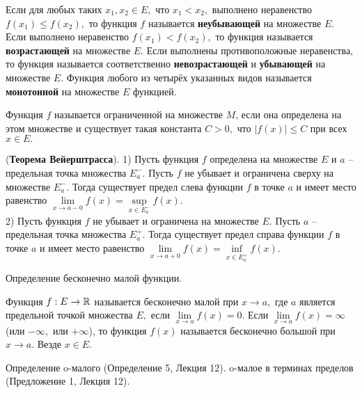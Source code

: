 \begin{definition}
	Если для любых таких $x_1, x_2 \in E,$
	что $x_1<x_2,$ выполнено неравенство
	$f(x_1)\leq f(x_2),$ то функция $f$
	называется \textbf{неубывающей} на множестве
	$E.$ Если выполнено неравенство
	$f(x_1)<f(x_2),$ то функция называется
	\textbf{возрастающей} на множестве $E.$ Если выполнены
	противоположные неравенства, то функция
	называется соответственно \textbf{невозрастающей}
	и \textbf{убывающей} на множестве $E.$
	Функция любого из четырёх
	указанных видов называется \textbf{монотонной}
	на множестве $E$ функцией.
\end{definition}

\begin{definition}
	Функция $f$
	называется ограниченной на множестве $M$,
	если она определена на этом множестве и
	существует такая константа $C>0,$
	что $|f(x)|\leq C$ при всех $x \in E.$
\end{definition}

\begin{theorem} (\textbf{Теорема Вейерштрасса}).
	1) Пусть функция $f$ определена на множестве $E$
	и $a$ -- предельная точка
	множества $E^-_a.$
	Пусть $f$ не убывает и ограничена сверху
	на множестве $E^-_a.$ Тогда существует предел слева
	функции $f$ в точке $a$ и имеет место равенство
	$
		\lim\limits_{x\rightarrow a-0}f(x)=
		\sup\limits_{x \in E^-_a}f(x).
	$\\
	2) Пусть функция $f$ не убывает и ограничена
	на множестве $E.$ Пусть $a$ -- предельная точка
	множества $E^+_a.$ Тогда существует предел справа
	функции $f$ в точке $a$ и имеет место равенство
	$
		\lim\limits_{x\rightarrow a+0}f(x)=
		\inf\limits_{x \in E^+_a}f(x).
	$
\end{theorem}

\newpage
\begin{problem}
Определение бесконечно малой функции.
\end{problem}

\begin{definition} Функция $f: E\rightarrow\mathbb{R}$
	называется бесконечно малой при
	$x\rightarrow a,$ где $a$ является предельной
	точкой множества $E,$ если
	$\lim\limits_{x\rightarrow a}f(x)=0.$
	Если
	$\lim\limits_{x\rightarrow a}f(x)
		=\infty$ (или $-\infty,$
	или $+\infty$), то функция
	$f(x)$ называется бесконечно большой
	при $x\rightarrow a.$ Везде $x \in E.$
\end{definition}


\newpage
\begin{problem}
Определение o-малого (Определение 5, Лекция 12). o-малое в терминах пределов
(Предложение 1, Лекция 12).
\end{problem}


